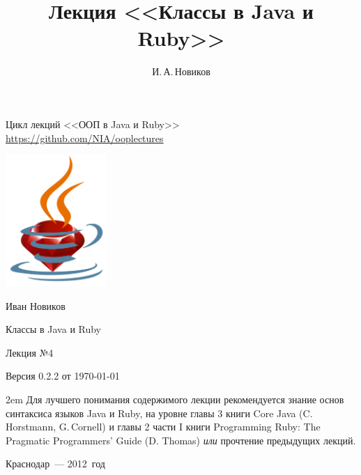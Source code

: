 \documentclass[a4paper, 14pt, titlepage]{extarticle}
\author{И.\,А.\,Новиков}
\title{Лекция <<Классы в Java и Ruby>>}
\newcommand{\eng}[1]{{\English #1}}
\newenvironment{indented}%
    { \begingroup %
        \noindent %
        \leftskip2em %
        \rightskip\leftskip }%
    { \par\endgroup }
\begin{document}

  \begin{titlepage}
  \begin{center}
    Цикл лекций <<ООП в Java и Ruby>>\\
    \url{https://github.com/NIA/ooplectures}

    \vspace{4cm}
    
    \includegraphics[height=5cm]{ruby-in-cup}

    Иван Новиков

    {\Large Классы в Java и Ruby}

    Лекция №4

    {\small Версия 0.2.2 от \today}

  \end{center}

    \begin{flushright}

    \end{flushright}

    \vspace{3cm}
    
    \begin{indented}
      \small Для лучшего понимания содержимого лекции рекомендуется знание основ синтаксиса языков
      Java и Ruby, на уровне главы 3 книги \eng{Core Java (C.\,Horstmann, G.\,Cornell)} и главы 2
      части I книги \eng{Programming Ruby: The Pragmatic Programmers' Guide (D. Thomas)} \emph{или}
      прочтение предыдущих лекций.
    \end{indented}

    \vfill
  
  \begin{center}

    Краснодар~--- 2012~год

  \end{center}
  \end{titlepage}
\end{document}
